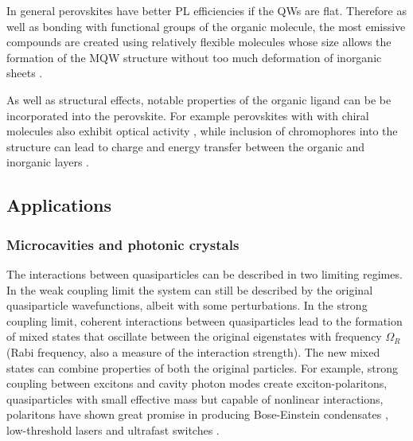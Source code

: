 In general perovskites have better PL efficiencies if the QWs are flat. Therefore as well as bonding with functional groups of the organic molecule, the most emissive compounds are created using relatively flexible molecules whose size allows the formation of the MQW structure without too much deformation of inorganic sheets \cite{Zhang2009}.

As well as structural effects, notable properties of the organic ligand can be be incorporated into the perovskite. For example perovskites with with chiral molecules also exhibit optical activity \cite{Teshima2003}, while inclusion of chromophores into the structure can lead to charge and energy transfer between the organic and inorganic layers \cite{Kawabata2009, Mitzi1999a, Braun1999}.

\subsection{Applications}
\subsubsection{Microcavities and photonic crystals}
The interactions between quasiparticles can be described in two limiting regimes. In the weak coupling limit the system can still be described by the original quasiparticle wavefunctions, albeit with some perturbations. In the strong coupling limit, coherent interactions between quasiparticles lead to the formation of mixed states that oscillate between the original eigenstates with frequency $\Omega_R$ (Rabi frequency, also a measure of the interaction strength). The new mixed states can combine properties of both the original particles. For example, strong coupling between excitons and cavity photon modes create exciton-polaritons, quasiparticles with small effective mass but capable of nonlinear interactions, polaritons have shown great promise in producing Bose-Einstein condensates \cite{Kasprzak2006}, low-threshold lasers \cite{Christopoulos2007} and ultrafast switches \cite{Amo2010}.

